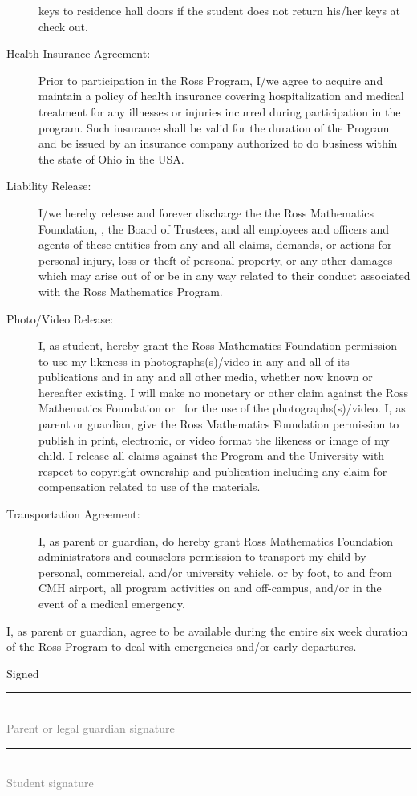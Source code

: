 \documentclass{ross}
\begin{document}
\begin{description}
  keys to residence hall doors if the student does not return his/her
  keys at check out.
\item[Health Insurance Agreement:] Prior to participation in the Ross
  Program, I/we agree to acquire and maintain a policy of health
  insurance covering hospitalization and medical treatment for any
  illnesses or injuries incurred during participation in the
  program. Such insurance shall be valid for the duration of the
  Program and be issued by an insurance company authorized to do
  business within the state of Ohio in the USA.
\item[Liability Release:] I/we hereby release and forever discharge
  the the Ross Mathematics Foundation, 
  \campus, the Board  of Trustees, and 
  all employees and officers and agents of these entities from any
  and all claims, demands, or actions for personal injury, loss or
  theft of personal property, or any other damages which may arise out
  of or be in any way related to their conduct associated with the
  Ross Mathematics Program.
\item[Photo/Video Release:] I, as student, hereby grant the Ross
  Mathematics Foundation permission to use my likeness in
  photographs(s)/video in any and all of its publications and in any
  and all other media, whether now known or hereafter existing. I will
  make no monetary or other claim against the Ross Mathematics Foundation or
  \campus\ for the use of the photographs(s)/video. I, as parent or
  guardian, give the Ross Mathematics Foundation permission to publish in
  print, electronic, or video format the likeness or image of my
  child. I release all claims against the Program and the University
  with respect to copyright ownership and publication including any
  claim for compensation related to use of the materials.
\item[Transportation Agreement:] I, as parent or guardian, do hereby
  grant Ross Mathematics Foundation administrators and counselors
  permission to transport my child by personal, commercial, and/or
  university vehicle, or by foot, to and from CMH airport, all program
  activities on and off-campus, and/or in the event of a medical
  emergency.
\end{description}
I, as parent or guardian, agree to be available during the entire six
week duration of the Ross Program to deal with emergencies and/or early
departures.

\vspace{0.5in}
\hfill Signed \rule{3in}{0.1mm}\\[-1.5mm]
\hspace*{3.7in} {\footnotesize \textcolor{gray}{Parent or legal guardian signature} }


\vspace{0.5in}

\hfill  \rule{3in}{0.1mm}\\[-1.5mm]
\hspace*{3.7in} {\footnotesize \textcolor{gray}{Student signature} }


\end{document}
